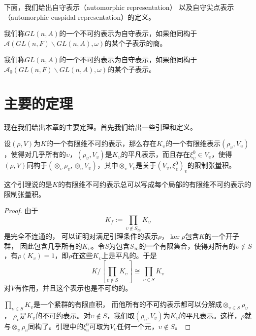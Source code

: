   下面，我们给出自守表示（automorphic representation）
  以及自守尖点表示（automorphic cuspidal representation）的定义。

  \begin{definition}[自守表示]
  我们称$GL(n,A)$的一个不可约表示为自守表示，如果他同构于$\mathcal {A}(GL(n,F)\backslash
  GL(n,A),\omega)$的某个子表示的商。
  \end{definition}

  \begin{definition}[自守尖点表示]
  我们称$GL(n,A)$的一个不可约表示为自守表示，如果他同构于$\mathcal {A}_0(GL(n,F)\backslash
  GL(n,A),\omega)$的某个子表示。
  \end{definition}

\section{主要的定理}
  现在我们给出本章的主要定理。首先我们给出一些引理和定义。
  \begin{lemma}
  设$(\rho,
  V)$为$K$的一个有限维不可约表示，那么存在$K_{\upsilon}$的一个有限维表示$(\rho_{\upsilon},
  V_{\upsilon})$，使得对几乎所有的$\upsilon$，$(\rho_{\upsilon},
  V_{\upsilon})$是$K_{\upsilon}$的平凡表示，而且存在$\xi_{\upsilon}^0\in
  V_{\upsilon}$，使得$(\rho,V)$同构于$(\otimes_{\upsilon} \rho_{\upsilon}, \otimes_{\upsilon}
  V_{\upsilon})$，其中$\otimes_{\upsilon} V_{\upsilon}$是关于$(V_{\upsilon},
  \xi_{\upsilon}^0)_{\upsilon}$的限制张量积。
  \end{lemma}
  这个引理说的是$K$的有限维不可约表示总可以写成每个局部的有限维不可约表示的限制张量积。
  \begin{proof}
  由于$$K_f := \prod\limits_{\upsilon\not\in S_{\infty}} K_{\upsilon}$$是完全不连通的，
  可以证明对满足引理条件的表示$\rho$，$\ker\rho$包含$K$的一个开子群，
  因此包含几乎所有的$K_{\upsilon}$。令$S$为包含$S_{\infty}$的一个有限集合，使得对所有的$\upsilon\not\in
  S$，有$\rho(K_{\upsilon}) =
  1$，即$\rho$在这些$K_{\upsilon}$上是平凡的。于是
  $$K/[\prod\limits_{\upsilon\not\in S} K_{\upsilon}]\cong \prod\limits_{\upsilon\in S} K_{\upsilon}$$
  对$V$有作用，并且这个表示也是不可约的。

  $\prod\limits_{\upsilon\in S} K_{\upsilon}$是一个紧群的有限直积，
  而他所有的不可约表示都可以分解成$\otimes_{\upsilon\in S}\rho_{\upsilon}$，
  $\rho_{\upsilon}$是$K_{\upsilon}$的不可约表示。对$\upsilon\not\in
  S$，我们取$(\rho_{\upsilon}, V_{\upsilon})$为$K_{\upsilon}$的平凡表示。这样，$\rho$就与$\otimes_{\upsilon}
  \rho_{\upsilon}$同构了。引理中的$\xi_{\upsilon}^0$可取为$V_{\upsilon}$任何一个元，$\upsilon\not\in
  S$。
  \end{proof}


